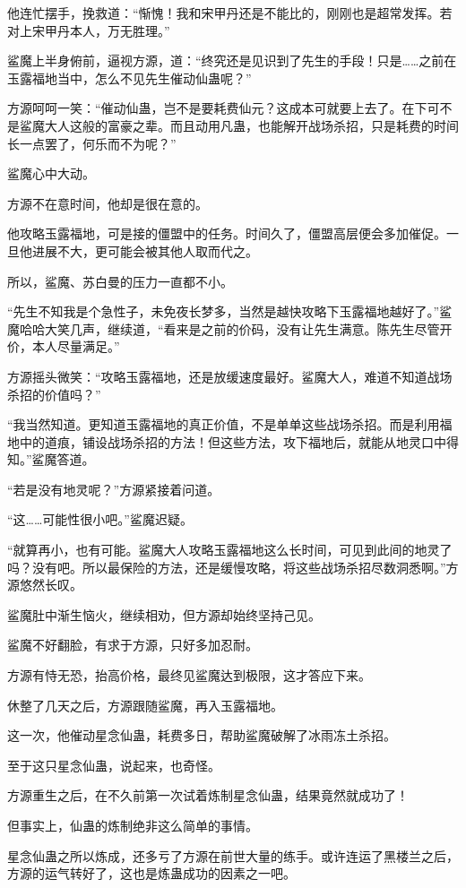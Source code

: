 \begin{this_body}
他连忙摆手，挽救道：“惭愧！我和宋甲丹还是不能比的，刚刚也是超常发挥。若对上宋甲丹本人，万无胜理。”

鲨魔上半身俯前，逼视方源，道：“终究还是见识到了先生的手段！只是……之前在玉露福地当中，怎么不见先生催动仙蛊呢？”

方源呵呵一笑：“催动仙蛊，岂不是要耗费仙元？这成本可就要上去了。在下可不是鲨魔大人这般的富豪之辈。而且动用凡蛊，也能解开战场杀招，只是耗费的时间长一点罢了，何乐而不为呢？”

鲨魔心中大动。

方源不在意时间，他却是很在意的。

他攻略玉露福地，可是接的僵盟中的任务。时间久了，僵盟高层便会多加催促。一旦他进展不大，更可能会被其他人取而代之。

所以，鲨魔、苏白曼的压力一直都不小。

“先生不知我是个急性子，未免夜长梦多，当然是越快攻略下玉露福地越好了。”鲨魔哈哈大笑几声，继续道，“看来是之前的价码，没有让先生满意。陈先生尽管开价，本人尽量满足。”

方源摇头微笑：“攻略玉露福地，还是放缓速度最好。鲨魔大人，难道不知道战场杀招的价值吗？”

“我当然知道。更知道玉露福地的真正价值，不是单单这些战场杀招。而是利用福地中的道痕，铺设战场杀招的方法！但这些方法，攻下福地后，就能从地灵口中得知。”鲨魔答道。

“若是没有地灵呢？”方源紧接着问道。

“这……可能性很小吧。”鲨魔迟疑。

“就算再小，也有可能。鲨魔大人攻略玉露福地这么长时间，可见到此间的地灵了吗？没有吧。所以最保险的方法，还是缓慢攻略，将这些战场杀招尽数洞悉啊。”方源悠然长叹。

鲨魔肚中渐生恼火，继续相劝，但方源却始终坚持己见。

鲨魔不好翻脸，有求于方源，只好多加忍耐。

方源有恃无恐，抬高价格，最终见鲨魔达到极限，这才答应下来。

休整了几天之后，方源跟随鲨魔，再入玉露福地。

这一次，他催动星念仙蛊，耗费多日，帮助鲨魔破解了冰雨冻土杀招。

至于这只星念仙蛊，说起来，也奇怪。

方源重生之后，在不久前第一次试着炼制星念仙蛊，结果竟然就成功了！

但事实上，仙蛊的炼制绝非这么简单的事情。

星念仙蛊之所以炼成，还多亏了方源在前世大量的练手。或许连运了黑楼兰之后，方源的运气转好了，这也是炼蛊成功的因素之一吧。


\end{this_body}
